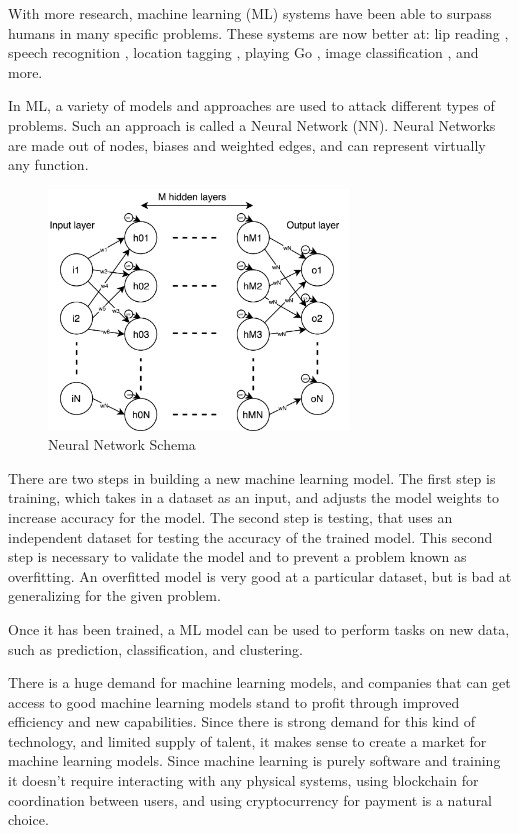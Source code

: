 \documentclass{article}
\begin{document}
With more research, machine learning (ML) systems have been able to surpass humans in many specific problems. These systems are now better at: lip reading \cite{lip_reading_paper}, speech recognition \cite{speach_recog_paper}, location tagging \cite{geo_loc_paper}, playing Go \cite{go_paper}, image classification \cite{human_imagenet_performance_paper}, and more.

In ML, a variety of models and approaches are used to attack different types of problems. Such an approach is called a Neural Network (NN). Neural Networks are made out of nodes, biases and weighted edges, and can represent virtually any function. \cite{nn_any_func_paper}

\begin{figure}[h]
\caption{Neural Network Schema}
\includegraphics[width=8cm]{protocol_nn_schema}
\end{figure}

There are two steps in building a new machine learning model. The first step is training, which takes in a dataset as an input, and adjusts the model weights to increase accuracy for the model. The second step is testing, that uses an independent dataset for testing the accuracy of the trained model. This second step is necessary to validate the model and to prevent a problem known as overfitting. An overfitted model is very good at a particular dataset, but is bad at generalizing for the given problem.

Once it has been trained, a ML model can be used to perform tasks on new data, such as prediction, classification, and clustering.

There is a huge demand for machine learning models, and companies that can get access to good machine learning models stand to profit through improved efficiency and new capabilities. Since there is strong demand for this kind of technology, and limited supply of talent, it makes sense to create a market for machine learning models. Since machine learning is purely software and training it doesn’t require interacting with any physical systems, using blockchain for coordination between users, and using cryptocurrency for payment is a natural choice.
\end{document}
